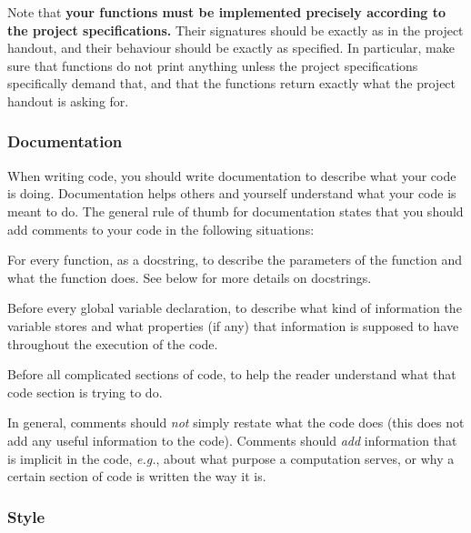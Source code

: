 \documentclass[11pt]{article}
\let\latinabb\emph
\newcommand*{\eg}{\latinabb{e.g.}}
\let\ezimeti\itemize
\let\ezimetidne\enditemize
\renewenvironment{itemize}
   {\ezimeti
    \setlength{\topsep}{.25ex plus .125ex minus .1825ex}%
    \setlength{\itemsep}{\topsep}\setlength{\parsep}{0ex}%
    \setlength{\leftmargin}{1.75em}\setlength{\labelsep}{.5em}%
    \setlength{\labelwidth}{1.75em}\ignorespaces}
   {\ezimetidne}
\newcommand*{\heading}[1]{\subsubsection*{#1}}
\begin{document}
Note that \textbf{your functions must be implemented precisely according to the project specifications.} Their signatures should be exactly as in the project handout, and their behaviour should be exactly as specified. In particular, make sure that functions do not print anything unless the project specifications specifically demand that, and that the functions return exactly what the project handout is asking for.

\heading{Documentation}

When writing code, you should write documentation to describe what your code 
is doing.  Documentation helps others and yourself understand what your 
code is meant to do.  The general rule of thumb for documentation states 
that you should add comments to your code in the following situations:
\begin{itemize}
\item
    For every function, as a docstring, to describe the parameters of the 
    function and what the function does.  See below for more details on 
    docstrings.
\item
    Before every global variable declaration, to describe what kind of 
    information the variable stores and what properties (if any) that 
    information is supposed to have throughout the execution of the code.
\item
    Before all complicated sections of code, to help the reader understand 
    what that code section is trying to do.
\item
    In general, comments should \emph{not} simply restate what the code 
    does (this does not add any useful information to the code).  Comments 
    should \emph{add} information that is implicit in the code, \eg, about 
    what purpose a computation serves, or why a certain section of code is 
    written the way it is.
\end{itemize}

\heading{Style}
\end{document}
